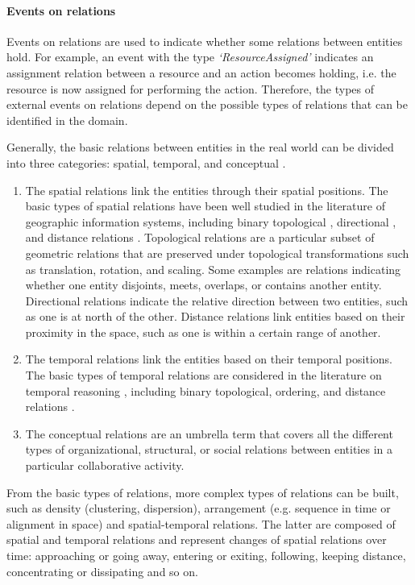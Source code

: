 \paragraph*{Events on relations} %
\label{par:events_on_relations}
Events on relations are used to indicate whether some relations between entities hold. For example, an event with the type \emph{`ResourceAssigned'} indicates an assignment relation between a resource and an action becomes holding, i.e. the resource is now assigned for performing the action. Therefore, the types of external events on relations depend on the possible types of relations that can be identified in the domain. 

Generally, the basic relations between entities in the real world can be divided into three categories: spatial, temporal, and conceptual \cite{Tomaszewski2010}.

\begin{enumerate}
	\item The spatial relations link the entities through their spatial positions. The basic types of spatial relations have been well studied in the literature of geographic information systems, including binary topological \cite{egenhofer1994deriving}, directional \cite{frank1991qualitative}, and distance relations \cite{hernandez1995qualitative}. Topological relations are a particular subset of geometric relations that are preserved under topological transformations such as translation, rotation, and scaling. Some examples are relations indicating whether one entity disjoints, meets, overlaps, or contains another entity. Directional relations indicate the relative direction between two entities, such as one is at north of the other. Distance relations link entities based on their proximity in the space, such as one is within a certain range of another. 
	\item The temporal relations link the entities based on their temporal positions. The basic types of temporal relations are considered in the literature on temporal reasoning \cite{allen1994actions}, including binary topological, ordering, and distance relations \cite{Andrienko2011}.
	\item The conceptual relations are an umbrella term that covers all the different types of organizational, structural, or social relations between entities in a particular collaborative activity. 
\end{enumerate}

From the basic types of relations, more complex types of relations can be built, such as
density (clustering, dispersion), arrangement (e.g. sequence in time or alignment in space) and spatial-temporal relations. The latter are composed of spatial and temporal relations and represent changes of spatial relations over time: approaching or going away, entering or exiting, following, keeping distance, concentrating or dissipating and so on.

